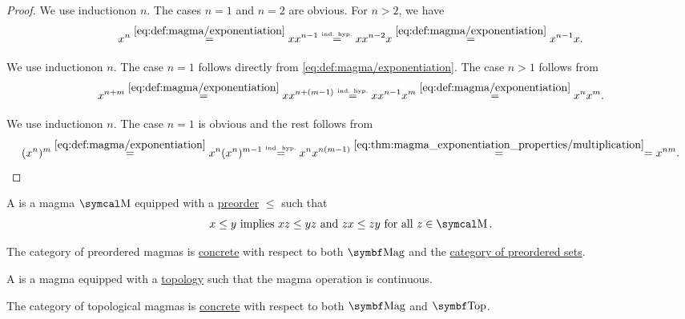 \begin{proof}
   We use induction\IND on \( n \). The cases \( n = 1 \) and \( n = 2 \) are obvious. For \( n > 2 \), we have
  \begin{equation*}
    x^n
    \overset {\eqref{eq:def:magma/exponentiation}} =
    x x^{n-1}
    \overset {\scriptscriptstyle{\text{ind. hyp.}}} =
    x x^{n-2} x
    \overset {\eqref{eq:def:magma/exponentiation}} =
    x^{n-1} x.
  \end{equation*}

   We use induction\LEM on \( n \). The case \( n = 1 \) follows directly from \eqref{eq:def:magma/exponentiation}. The case \( n > 1 \) follows from
  \begin{equation*}
    x^{n + m}
    \overset {\eqref{eq:def:magma/exponentiation}} =
    x x^{n + (m - 1)}
    \overset {\scriptscriptstyle{\text{ind. hyp.}}} =
    x x^{n-1} x^m
    \overset {\eqref{eq:def:magma/exponentiation}} =
    x^n x^m.
  \end{equation*}

   We use induction\LEM on \( n \). The case \( n = 1 \) is obvious and the rest follows from
  \begin{equation*}
    (x^n)^m
    \overset {\eqref{eq:def:magma/exponentiation}} =
    x^n (x^n)^{m-1}
    \overset {\scriptscriptstyle{\text{ind. hyp.}}} =
    x^n x^{n (m - 1)}
    \overset {\eqref{eq:thm:magma_exponentiation_properties/multiplication}} =
    =
    x^{nm}.
  \end{equation*}
\end{proof}

\begin{definition}\label{def:preordered_magma}
  A  is a magma \( \CM \) equipped with a \hyperref[def:preordered_set]{preorder} \( \leq \) such that
  \begin{equation}\label{eq:def:preordered_magma/compatibility}
    x \leq y \T{implies} xz \leq yz \T{and} zx \leq zy \T{for all} z \in \CM.
  \end{equation}

  The category of preordered magmas is \hyperref[def:concrete_category]{concrete} with respect to both \( \Cat{Mag} \) and the \hyperref[def:magma/preordered]{category of preordered sets}.
\end{definition}

\begin{definition}\label{def:topological_magma}
  A  is a magma equipped with a \hyperref[def:topological_space]{topology} such that the magma operation is continuous.

  The category of topological magmas is \hyperref[def:concrete_category]{concrete} with respect to both \( \Cat{Mag} \) and \hyperref[def:category_of_topological_spaces]{\( \Cat{Top} \)}.
\end{definition}
